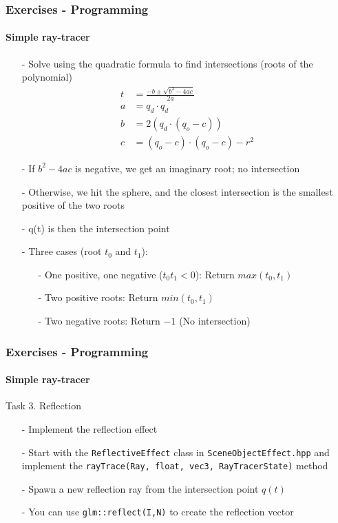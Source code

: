 \documentclass[8pt]{beamer}
\begin{document}
	\begin{frame}[fragile]
	\frametitle{Exercises - Programming}
	\framesubtitle{Simple ray-tracer}
	\begin{enumerate}
	\item[-] Solve using the quadratic formula to find intersections (roots of the polynomial)
	\begin{align*}
	t &= \frac{-b\pm\sqrt{b^2-4ac}}{2a} \\
	a &= q_d \cdot q_d\\
	b &= 2(q_d \cdot(q_o - c))\\
	c &= (q_o-c)\cdot(q_o-c)-r^2
	\end{align*}
	\item[-]If $b^2-4ac$ is negative, we get an imaginary root; no intersection
	\item[-]Otherwise, we hit the sphere, and the closest intersection is the smallest positive of the two roots
	\item[-]q(t) is then the intersection point
	\item[-] Three cases (root $t_0$ and $t_1$):
	\begin{enumerate}
	\item[-]One positive, one negative ($t_0t_1 < 0$):
		Return $max(t_0, t_1)$
	\item[-] Two positive roots: 
		Return $min(t_0, t_1)$
	\item[-]Two negative roots: Return $-1$ (No intersection)
	\end{enumerate}		
	\end{enumerate}
	
	\end{frame}
	
	\begin{frame}[fragile]
	\frametitle{Exercises - Programming}
	\framesubtitle{Simple ray-tracer}
	Task 3. Reflection
	\begin{enumerate}
	\item[-] Implement the reflection effect
	\item[-] Start with the \verb|ReflectiveEffect| class in \verb|SceneObjectEffect.hpp| and implement the \verb|rayTrace(Ray, float, vec3, RayTracerState)| method
	\item[-] Spawn a new reflection ray from the intersection point $q(t)$ 
	\item[-] You can use \verb|glm::reflect(I,N)| to create the reflection vector
	\end{enumerate}		
	\end{frame}
	
\end{document}
